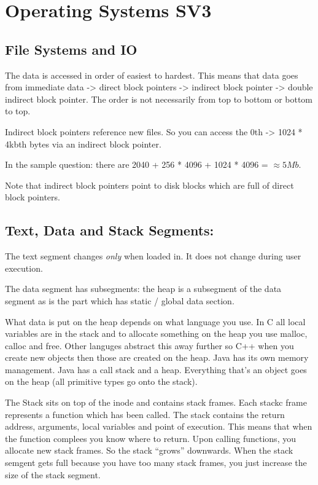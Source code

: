 \documentclass[10pt,\jkfside,a4paper]{article}
\begin{document}
\section*{Operating Systems SV3}

\subsection*{File Systems and IO}

The data is accessed in order of easiest to hardest. 
This means that data goes from immediate data -> direct block pointers 
-> indirect block pointer -> double indirect block pointer. 
The order is not necessarily from top to bottom or bottom to 
top.

Indirect block pointers reference new files. So you can access the 0th -> 1024 * 4kbth bytes 
via an indirect block pointer.

In the sample question: there are 2040 + 256 * 4096 + 1024 * 4096 = $\approx 5Mb$.

Note that indirect block pointers point to disk blocks which are full of direct block pointers.

\subsection*{Text, Data and Stack Segments:}

The text segment changes \textit{only} when loaded in. It does not change during user execution.

The data segment has subsegments: the heap is a subsegment of the data segment as is the 
part which has static / global data section.

What data is put on the heap depends on what language you use. In C all local variables are 
in the stack and to allocate something on the heap you use malloc, calloc and free.
Other languges abstract this away further so C++ when you create new objects then those 
are created on the heap. Java has its own memory management. Java has a call stack and a heap. 
Everything that's an object goes on the heap (all primitive types go onto the stack). 

The Stack sits on top of the inode and contains stack frames. Each stackc frame represents a function 
which has been called. The stack contains the return address, arguments, local variables and point of 
execution. This means that when the function complees you know where 
to return. Upon calling functions, you allocate new stack frames. So the stack ``grows'' downwards. When 
the stack semgent gets full because you have too many stack frames, you just increase the size of the stack 
segment.
\end{document}
